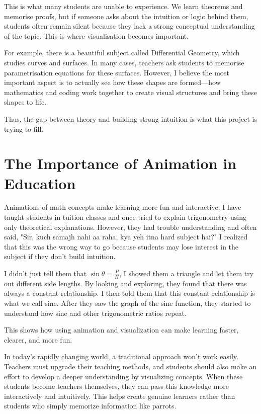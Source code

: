 \documentclass[12pt, a4paper]{report}
\begin{document}
This is what many students are unable to experience. We learn theorems and memorise proofs, but if someone asks about the intuition or logic behind them, students often remain silent because they lack a strong conceptual understanding of the topic. This is where visualisation becomes important.

For example, there is a beautiful subject called Differential Geometry, which studies curves and surfaces. In many cases, teachers ask students to memorise parametrisation equations for these surfaces. However, I believe the most important aspect is to actually see how these shapes are formed—how mathematics and coding work together to create visual structures and bring these shapes to life.

Thus, the gap between theory and building strong intuition is what this project is trying to fill.


\section{The Importance of Animation in Education}

Animations of math concepts make learning more fun and interactive. I have taught students in tuition classes and once tried to explain trigonometry using only theoretical explanations. However, they had trouble understanding and often said, "Sir, kuch samajh nahi aa raha, kya yeh itna hard subject hai?" I realized that this was the wrong way to go because students may lose interest in the subject if they don't build intuition.

I didn't just tell them that $\sin \theta = \frac{P}{H}$, I showed them a triangle and let them try out different side lengths. By looking and exploring, they found that there was always a constant relationship. I then told them that this constant relationship is what we call sine. After they saw the graph of the sine function, they started to understand how sine and other trigonometric ratios repeat.

This shows how using animation and visualization can make learning faster, clearer, and more fun.

In today's rapidly changing world, a traditional approach won't work easily. Teachers must upgrade their teaching methods, and students should also make an effort to develop a deeper understanding by visualizing concepts. When these students become teachers themselves, they can pass this knowledge more interactively and intuitively. This helps create genuine learners rather than students who simply memorize information like parrots.
\end{document}
